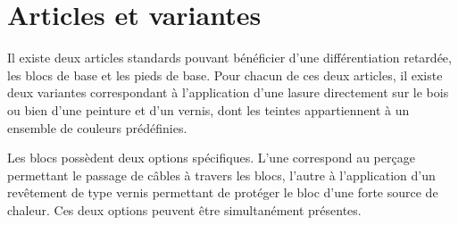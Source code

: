 \section{Articles et variantes}

Il existe deux articles standards pouvant bénéficier d'une différentiation
retardée, les blocs de base et les pieds de base.
Pour chacun de ces deux articles, il existe deux variantes correspondant
à l'application d'une lasure directement sur le bois ou bien d'une peinture
et d'un vernis, dont les teintes appartiennent à un ensemble de couleurs
prédéfinies.

Les blocs possèdent deux options spécifiques. L'une correspond au perçage
permettant le passage de câbles à travers les blocs, l'autre à l'application
d'un revêtement de type vernis permettant de protéger le bloc d'une forte 
source de chaleur. Ces deux options peuvent être simultanément présentes.

